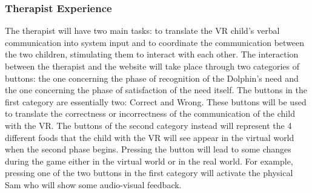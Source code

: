 \documentclass [12pt]{article}
\begin{document}
\subsubsection{Therapist Experience}
The therapist will have two main tasks: to translate the VR child's verbal communication into system input and to coordinate the communication between the two children, stimulating them to interact with each other. 
The interaction between the therapist and the website will take place through two categories of buttons: the one concerning the phase of recognition of the Dolphin's need and the one concerning the phase of satisfaction of the need itself.
The buttons in the first category are essentially two: Correct and Wrong. These buttons will be used to translate the correctness or incorrectness of the communication of the child with the VR.
The buttons of the second category instead will represent the 4 different foods that the child with the VR will see appear in the virtual world when the second phase begins.
Pressing the button will lead to some changes during the game either in the virtual world or in the real world. For example, pressing one of the two buttons in the first category will activate the physical Sam who will show some audio-visual feedback.
\end{document}
